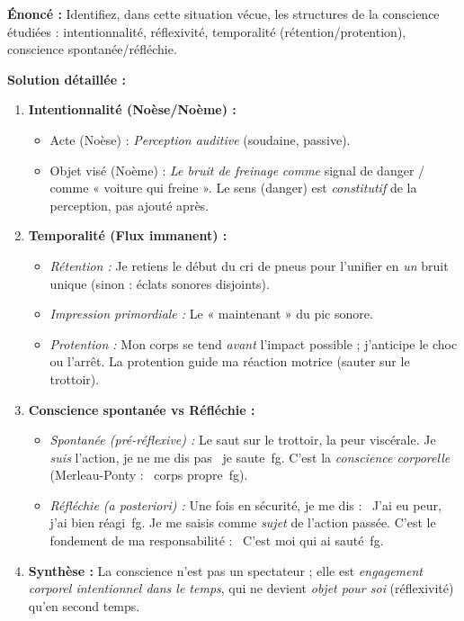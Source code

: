 \documentclass[11pt]{article}
\begin{document}
\begin{exoresolu}
\textbf{Énoncé :} Identifiez, dans cette situation vécue, les structures de la conscience étudiées : intentionnalité, réflexivité, temporalité (rétention/protention), conscience spontanée/réfléchie.

\medskip\noindent\textbf{Solution détaillée :}
\begin{enumerate}
    \item \textbf{Intentionnalité (Noèse/Noème) :}
    \begin{itemize}
        \item Acte (Noèse) : \emph{Perception auditive} (soudaine, passive).
        \item Objet visé (Noème) : \emph{Le bruit de freinage} \emph{comme} signal de danger / comme « voiture qui freine ». Le sens (danger) est \emph{constitutif} de la perception, pas ajouté après.
    \end{itemize}
    \item \textbf{Temporalité (Flux immanent) :}
    \begin{itemize}
        \item \emph{Rétention :} Je retiens le début du cri de pneus pour l'unifier en \emph{un} bruit unique (sinon : éclats sonores disjoints).
        \item \emph{Impression primordiale :} Le « maintenant » du pic sonore.
        \item \emph{Protention :} Mon corps se tend \emph{avant} l'impact possible ; j'anticipe le choc ou l'arrêt. La protention guide ma réaction motrice (sauter sur le trottoir).
    \end{itemize}
    \item \textbf{Conscience spontanée vs Réfléchie :}
    \begin{itemize}
        \item \emph{Spontanée (pré-réflexive) :} Le saut sur le trottoir, la peur viscérale. Je \emph{suis} l'action, je ne me dis pas \og~je saute~fg{}. C'est la \emph{conscience corporelle} (Merleau-Ponty : \og~corps propre~fg{}).
        \item \emph{Réfléchie (a posteriori) :} Une fois en sécurité, je me dis : \og~J'ai eu peur, j'ai bien réagi~fg{}. Je me saisis comme \emph{sujet} de l'action passée. C'est le fondement de ma responsabilité : \og~C'est moi qui ai sauté~fg{}.
    \end{itemize}
    \item \textbf{Synthèse :} La conscience n'est pas un spectateur ; elle est \emph{engagement corporel intentionnel dans le temps}, qui ne devient \emph{objet pour soi} (réflexivité) qu'en second temps.
\end{enumerate}
\end{exoresolu}
\end{document}
